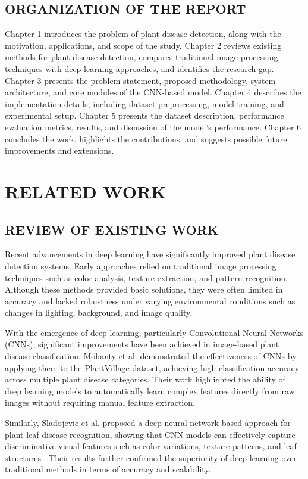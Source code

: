\documentclass[12pt]{report}
\begin{document}
\section{ORGANIZATION OF THE REPORT}
Chapter 1 introduces the problem of plant disease detection, along with the motivation, applications, and scope of the study. Chapter 2 reviews existing methods for plant disease detection, compares traditional image processing techniques with deep learning approaches, and identifies the research gap. Chapter 3 presents the problem statement, proposed methodology, system architecture, and core modules of the CNN-based model. Chapter 4 describes the implementation details, including dataset preprocessing, model training, and experimental setup. Chapter 5 presents the dataset description, performance evaluation metrics, results, and discussion of the model’s performance. Chapter 6 concludes the work, highlights the contributions, and suggests possible future improvements and extensions.

\chapter{RELATED WORK}

\section{REVIEW OF EXISTING WORK}

Recent advancements in deep learning have significantly improved plant disease detection systems. Early approaches relied on traditional image processing techniques such as color analysis, texture extraction, and pattern recognition. Although these methods provided basic solutions, they were often limited in accuracy and lacked robustness under varying environmental conditions such as changes in lighting, background, and image quality.

With the emergence of deep learning, particularly Convolutional Neural Networks (CNNs), significant improvements have been achieved in image-based plant disease classification. Mohanty et al. demonstrated the effectiveness of CNNs by applying them to the PlantVillage dataset, achieving high classification accuracy across multiple plant disease categories. Their work highlighted the ability of deep learning models to automatically learn complex features directly from raw images without requiring manual feature extraction.

Similarly, Sladojevic et al. proposed a deep neural network-based approach for plant leaf disease recognition, showing that CNN models can effectively capture discriminative visual features such as color variations, texture patterns, and leaf structures \parencite{cnnplant}. Their results further confirmed the superiority of deep learning over traditional methods in terms of accuracy and scalability.
\end{document}
